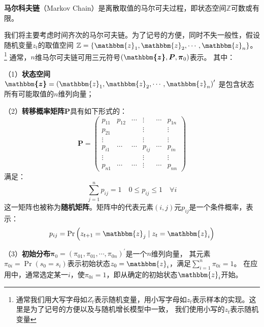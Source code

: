\begin{definition}
    \textbf{马尔科夫链}（Markov Chain）是离散取值的马尔可夫过程，即状态空间$\mathbb{Z}$可数或有限。
\end{definition}

我们将主要考虑时间齐次的马尔可夫链。为了记号的方便，同时不失一般性，假设随机变量$z_t$的取值空间
$\mathbb{Z}=\{\mathbbm{z}_1,\mathbbm{z}_2,\cdots,\mathbbm{z}_n\}$。
\footnote{通常我们用大写字母如$Z_t$表示随机变量，用小写字母如$z_t$表示样本的实现。这里是为了记号的方便以及与随机增长模型中一致，
我们使用小写的$z_t$表示随机变量}
通常，$n$维马尔可夫链可用三元符号$\left(\boldsymbol{\mathbbm{z}},\boldsymbol{P},\boldsymbol{\pi}_0\right)$表示。
其中：

（1）\textbf{状态空间}$\boldsymbol{\mathbbm{z}}=\left(\mathbbm{z}_1,\mathbbm{z}_2,\cdots,\mathbbm{z}_n\right)^{\prime}$
是包含状态所有可能取值的$n$维列向量；

（2）\textbf{转移概率矩阵}$\boldsymbol{P}$具有如下形式的：
\begin{equation*}
    \boldsymbol{P}=\left(\begin{array}{cccccc}
        p_{11} & p_{12} & \cdots & \vdots & \cdots & p_{1 n} \\
        p_{21} & & & \vdots & & \vdots \\
        \vdots & & & \vdots & & \vdots \\
        p_{i 1} & \cdots & \cdots & p_{i j} & \cdots & p_{i n} \\
        \vdots & & & \vdots & & \vdots \\
        p_{n 1} & \cdots & \cdots & \vdots & \cdots & p_{n n}
        \end{array}\right)
\end{equation*}
满足：
\begin{equation*}   
    \sum_{j=1}^{n}p_{ij}=1 \quad 0\leq p_{ij}\leq 1 \quad \forall i
\end{equation*}
这一矩阵也被称为\textbf{随机矩阵}。矩阵中的代表元素$\left(i,j\right)$元$p_{ij}$是一个条件概率，表示：
\begin{equation*}
    p_{ij}=\operatorname{Pr}\left(z_{t+1}=\mathbbm{z}_j\mid z_t = \mathbbm{z}_i\right)
\end{equation*}

（3）\textbf{初始分布}$\boldsymbol{\pi}_0=\left(\pi_{01},\pi_{01},\cdots,\pi_{0n}\right)^{\prime}$是一个$n$维列向量，
其元素$\pi_{0i}=\operatorname{Pr}\left(s_0=s_i\right)$表示初始状态$z_0=\mathbbm{z}_i$，满足$\sum_{i=1}^{n}\pi_{0i}=1$。
在应用中，通常选定某一$i$，使$\pi_{0i}=1$，即从确定的初始状态$\mathbbm{z}_i$开始。


